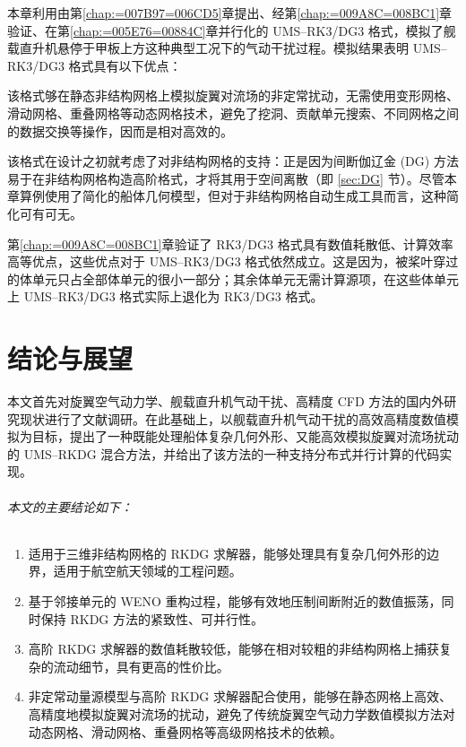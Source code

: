 本章利用由第\ref{chap:=007B97=006CD5}章提出、经第\ref{chap:=009A8C=008BC1}章验证、在第\ref{chap:=005E76=00884C}章并行化的
UMS–RK3/DG3 格式，模拟了舰载直升机悬停于甲板上方这种典型工况下的气动干扰过程。模拟结果表明 UMS–RK3/DG3 格式具有以下优点：
\begin{description}[wide]
\item [{能够高效地模拟旋翼对流场的扰动}] 该格式够在静态非结构网格上模拟旋翼对流场的非定常扰动，无需使用变形网格、滑动网格、重叠网格等动态网格技术，避免了挖洞、贡献单元搜索、不同网格之间的数据交换等操作，因而是相对高效的。
\item [{能够处理具有复杂几何外形的船体}] 该格式在设计之初就考虑了对非结构网格的支持：正是因为间断伽辽金 (DG) 方法易于在非结构网格构造高阶格式，才将其用于空间离散（即
\ref{sec:DG} 节）。尽管本章算例使用了简化的船体几何模型，但对于非结构网格自动生成工具而言，这种简化可有可无。
\item [{数值耗散低、计算效率高}] 第\ref{chap:=009A8C=008BC1}章验证了 RK3/DG3 格式具有数值耗散低、计算效率高等优点，这些优点对于
UMS–RK3/DG3 格式依然成立。这是因为，被桨叶穿过的体单元只占全部体单元的很小一部分；其余体单元无需计算源项，在这些体单元上
UMS–RK3/DG3 格式实际上退化为 RK3/DG3 格式。
\end{description}
%

\chapter*{结论与展望}


本文首先对旋翼空气动力学、舰载直升机气动干扰、高精度 CFD 方法的国内外研究现状进行了文献调研。在此基础上，以舰载直升机气动干扰的高效高精度数值模拟为目标，提出了一种既能处理船体复杂几何外形、又能高效模拟旋翼对流场扰动的
UMS–RKDG 混合方法，并给出了该方法的一种支持分布式并行计算的代码实现。

\subparagraph*{本文的主要结论如下：}
\begin{enumerate}[wide]
\item 适用于三维非结构网格的 RKDG 求解器，能够处理具有复杂几何外形的边界，适用于航空航天领域的工程问题。
\item 基于邻接单元的 WENO 重构过程，能够有效地压制间断附近的数值振荡，同时保持 RKDG 方法的紧致性、可并行性。
\item 高阶 RKDG 求解器的数值耗散较低，能够在相对较粗的非结构网格上捕获复杂的流动细节，具有更高的性价比。 
\item 非定常动量源模型与高阶 RKDG 求解器配合使用，能够在静态网格上高效、高精度地模拟旋翼对流场的扰动，避免了传统旋翼空气动力学数值模拟方法对动态网格、滑动网格、重叠网格等高级网格技术的依赖。
\end{enumerate}
%

